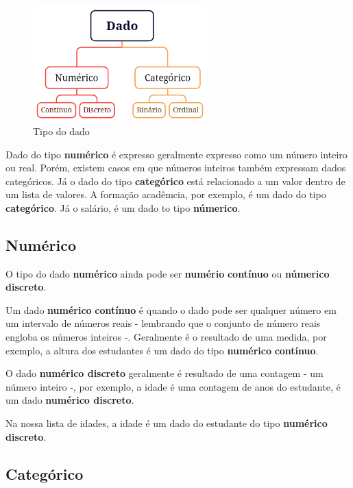 \documentclass[
]{book}
\begin{document}
\begin{figure}
\centering
\includegraphics[width=2.64583in,height=\textheight]{figuras/tipo_dado.png}
\caption{Tipo do dado}
\end{figure}

Dado do tipo \textbf{numérico} é expresso geralmente expresso como um número inteiro ou real. Porém, existem casos em que números inteiros também expressam dados categóricos. Já o dado do tipo \textbf{categórico} está relacionado a um valor dentro de um lista de valores. A formação acadêmcia, por exemplo, é um dado do tipo \textbf{categórico}. Já o salário, é um dado to tipo \textbf{númerico}.

\hypertarget{numuxe9rico}{%
\subsection{Numérico}\label{numuxe9rico}}

O tipo do dado \textbf{numérico} ainda pode ser \textbf{numério} \textbf{contínuo} ou \textbf{númerico} \textbf{discreto}.

Um dado \textbf{numérico} \textbf{contínuo} é quando o dado pode ser qualquer número em um intervalo de números reais - lembrando que o conjunto de número reais engloba os números inteiros -. Geralmente é o resultado de uma medida, por exemplo, a altura dos estudantes é um dado do tipo \textbf{numérico} \textbf{contínuo}.

O dado \textbf{numérico discreto} geralmente é resultado de uma contagem - um número inteiro -, por exemplo, a idade é uma contagem de anos do estudante, é um dado \textbf{numérico discreto}.

Na nossa lista de idades, a idade é um dado do estudante do tipo \textbf{numérico discreto}.

\hypertarget{categuxf3rico}{%
\subsection{Categórico}\label{categuxf3rico}}
\end{document}
